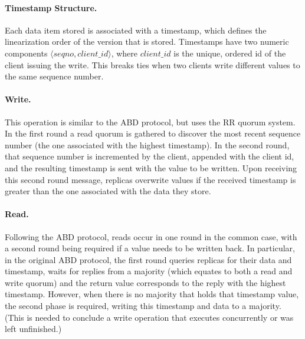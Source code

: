 \paragraph{Timestamp Structure.}
Each data item stored is associated with a
timestamp, which defines the linearization order of the version
that is stored. Timestamps have two numeric components $\langle
seqno, client\_id \rangle$, where $client\_id$ is the
unique, ordered id of the client issuing the write.  This
breaks ties when two clients write different values to the same
sequence number.

\paragraph{Write.}  This operation is similar to the ABD
protocol, but uses the \ac{RR} quorum system. In the first round
a read quorum is gathered to discover the most recent sequence number
(the one associated with the highest timestamp).  In the second round,
that sequence number is incremented by the client, appended with the
client id, and the resulting timestamp is sent with the value to be
written. Upon receiving this second round message, replicas overwrite
values if the received timestamp is greater than the one associated
with the data they store.


\paragraph{Read.} Following the ABD protocol, reads occur in one
round in the common case, with a second round being required if a
value needs to be written back. In particular, in the original ABD
protocol, the first round queries replicas for their data and
timestamp, waits for replies from a majority (which equates to both a
read and write quorum) and the return value corresponds to the reply
with the highest timestamp. However, when there is no majority that
holds that timestamp value, the second phase is required, writing this
timestamp and data to a majority. (This is needed to conclude a write
operation that executes concurrently or was left unfinished.)

